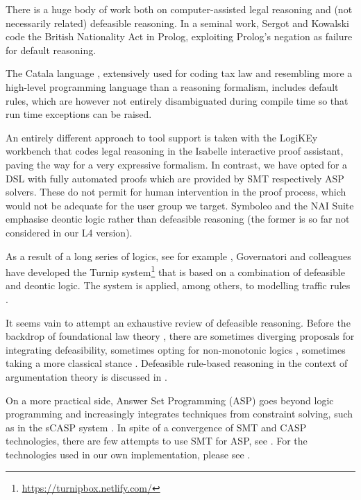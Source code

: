 There is a huge body of work both on computer-assisted legal reasoning and
(not necessarily related) defeasible reasoning. In a seminal work, Sergot and Kowalski
\cite{sergot_kowalski_etal__british_nationality_acm_1986,kowalski_legislation_logic_programs_1995}
code the British Nationality Act in Prolog, exploiting Prolog's negation as
failure for default reasoning.



The Catala language \cite{merigoux_chataing_protzenko_cata_icfp_2021},
extensively used for coding tax law and resembling more a high-level
programming language than a reasoning formalism, includes default rules, which
are however not entirely disambiguated during compile time so that run time
exceptions can be raised.

An entirely different approach to tool support is taken with the LogiKEy \cite{benzmueller_etal_logikey_2020}
workbench that codes legal reasoning in the Isabelle interactive proof assistant, paving
the way for a very expressive formalism. In contrast, we have opted for a DSL
with fully automated proofs which are provided by SMT respectively ASP solvers. These do not permit for human intervention in the proof process, which would not be adequate for the user group we target. Symboleo
\cite{sarifi_parvizimosaed_amyot_logrippo_mylopoulos_Symboleo_spec_legal_contracts_2020}
and the NAI Suite
\cite{libal_steen_nai_suite_draft_reason_legal_texts_jurix_2019} emphasise
deontic logic rather than defeasible reasoning (the former is so far not
considered in our L4 version).

As a result of a long series of logics, see for example
\cite{governatori_carnead_defeas_logic_icail_2011,governatori21:_unrav_legal_refer_defeas_deont_logic},
Governatori and colleagues have developed the Turnip
system\footnote{\url{https://turnipbox.netlify.com/}} that is based on a
combination of defeasible and deontic logic. The system is applied, among
others, to modelling traffic rules
\cite{governatori_Traffic_Rules_Encoding_using_Defeasible_jurix_2020}.

It seems vain to attempt an exhaustive
review of defeasible reasoning. Before the backdrop of foundational law
theory \cite{hart_concept_of_law_1997}, there are sometimes diverging
proposals for integrating defeasibility, sometimes opting for non-monotonic
logics \cite{hage_law_and_defeasibility_2003}, sometimes taking a more
classical stance \cite{alchourron_makinson_hierarchies_of_regulations_1981}. 
Defeasible rule-based reasoning in the context of argumentation theory is
discussed in \cite{dung_argumentation_theory_1995,amgoud_besnard_rule_based_argumentation_systems_2019}.

On a more practical side, Answer Set Programming (ASP) \cite{asp_background}
goes beyond logic programming and increasingly integrates techniques from
constraint solving, such as in the sCASP system
\cite{arias_phd_2019}. In spite of a convergence of SMT and CASP technologies,
there are few attempts to use SMT for ASP, see
\cite{shen_lierler_smt_answer_set_kr_2018}. For the technologies used in our
own implementation, please see . 



